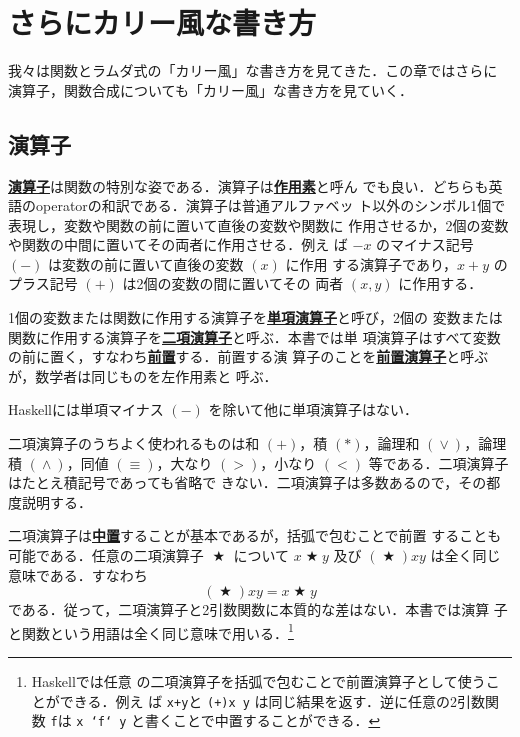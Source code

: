 \documentclass[a5paper,twoside,fleqn]{jsbook}
\newcommand{\programminglanguage}[1]{\textsf{#1}}
\newcommand{\haskell}{\programminglanguage{Haskell}}
\newenvironment{leader}{\begingroup\gt}{\endgroup}
\newcommand{\keyword}[1]{{\underline{\textbf{#1}}}}
\newcommand{\code}[1]{\texttt{#1}}
\DeclareMathOperator{\mBinOp}{\bigstar}
\DeclareMathOperator{\mLogicalAnd}{\wedge}
\DeclareMathOperator{\mLogicalOr}{\vee}
\begin{document}
\chapter{さらにカリー風な書き方}
\label{ch:more-curry}

\begin{leader}
我々は関数とラムダ式の「カリー風」な書き方を見てきた．この章ではさらに
演算子，関数合成についても「カリー風」な書き方を見ていく．
\end{leader}

\section{演算子}

\keyword{演算子}は関数の特別な姿である．演算子は\keyword{作用素}と呼ん
でも良い．どちらも英語のoperatorの和訳である．演算子は普通アルファベッ
ト以外のシンボル1個で表現し，変数や関数の前に置いて直後の変数や関数に
作用させるか，2個の変数や関数の中間に置いてその両者に作用させる．例え
ば $-x$ のマイナス記号 $(-)$ は変数の前に置いて直後の変数 $(x)$ に作用
する演算子であり，$x+y$ のプラス記号 $(+)$ は2個の変数の間に置いてその
両者 $(x,y)$ に作用する．

1個の変数または関数に作用する演算子を\keyword{単項演算子}と呼び，2個の
変数または関数に作用する演算子を\keyword{二項演算子}と呼ぶ．本書では単
項演算子はすべて変数の前に置く，すなわち\keyword{前置}する．前置する演
算子のことを\keyword{前置演算子}と呼ぶが，数学者は同じものを左作用素と
呼ぶ．

\haskell には単項マイナス $(-)$ を除いて他に単項演算子はない．

二項演算子のうちよく使われるものは和 $(+)$，積 $(*)$，論理和
$(\mLogicalOr)$，論理積 $(\mLogicalAnd)$，同値 $(\equiv)$，大なり
$(>)$，小なり $(<)$ 等である．二項演算子はたとえ積記号であっても省略で
きない．二項演算子は多数あるので，その都度説明する．

二項演算子は\keyword{中置}することが基本であるが，括弧で包むことで前置
することも可能である．任意の二項演算子 $\mBinOp$ について $x\mBinOp y$
及び $(\mBinOp)xy$ は全く同じ意味である．すなわち
\begin{equation}
\left(\mBinOp\right)xy=x\mBinOp y
\end{equation}
である．従って，二項演算子と2引数関数に本質的な差はない．本書では演算
子と関数という用語は全く同じ意味で用いる．\footnote{\haskell では任意
  の二項演算子を括弧で包むことで前置演算子として使うことができる．例え
  ば \code{x+y}と \code{(+)x y} は同じ結果を返す．逆に任意の2引数関数
  \code{f}は \code{x `f` y} と書くことで中置することができる．}
\end{document}
